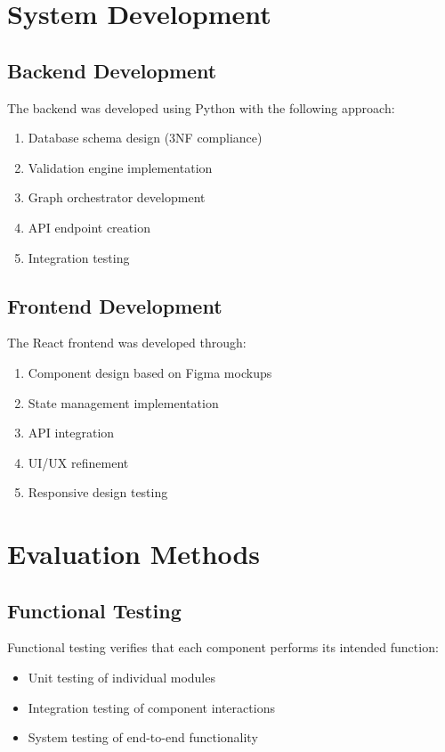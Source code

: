 \section{System Development}

\subsection{Backend Development}

The backend was developed using Python with the following approach:

\begin{enumerate}
    \item Database schema design (3NF compliance)
    \item Validation engine implementation
    \item Graph orchestrator development
    \item API endpoint creation
    \item Integration testing
\end{enumerate}

\subsection{Frontend Development}

The React frontend was developed through:

\begin{enumerate}
    \item Component design based on Figma mockups
    \item State management implementation
    \item API integration
    \item UI/UX refinement
    \item Responsive design testing
\end{enumerate}

\section{Evaluation Methods}

\subsection{Functional Testing}

Functional testing verifies that each component performs its intended function:

\begin{itemize}
    \item Unit testing of individual modules
    \item Integration testing of component interactions
    \item System testing of end-to-end functionality
\end{itemize}

